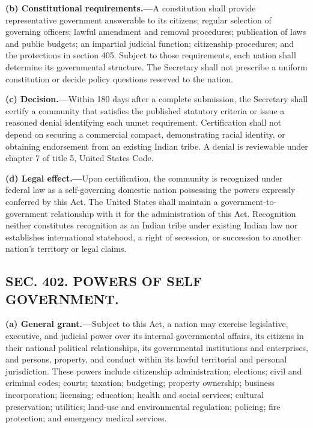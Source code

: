 \documentclass[12pt,letterpaper]{article}
\begin{document}
\textbf{(b) Constitutional requirements.---}A constitution shall provide representative government answerable to its citizens; regular selection of governing officers; lawful amendment and removal procedures; publication of laws and public budgets; an impartial judicial function; citizenship procedures; and the protections in section 405. Subject to those requirements, each nation shall determine its governmental structure. The Secretary shall not prescribe a uniform constitution or decide policy questions reserved to the nation.

\textbf{(c) Decision.---}Within 180 days after a complete submission, the Secretary shall certify a community that satisfies the published statutory criteria or issue a reasoned denial identifying each unmet requirement. Certification shall not depend on securing a commercial compact, demonstrating racial identity, or obtaining endorsement from an existing Indian tribe. A denial is reviewable under chapter 7 of title 5, United States Code.

\textbf{(d) Legal effect.---}Upon certification, the community is recognized under federal law as a self-governing domestic nation possessing the powers expressly conferred by this Act. The United States shall maintain a government-to-government relationship with it for the administration of this Act. Recognition neither constitutes recognition as an Indian tribe under existing Indian law nor establishes international statehood, a right of secession, or succession to another nation's territory or legal claims.

\subsection*{SEC. 402. POWERS OF SELF GOVERNMENT.}

\textbf{(a) General grant.---}Subject to this Act, a nation may exercise legislative, executive, and judicial power over its internal governmental affairs, its citizens in their national political relationships, its governmental institutions and enterprises, and persons, property, and conduct within its lawful territorial and personal jurisdiction. These powers include citizenship administration; elections; civil and criminal codes; courts; taxation; budgeting; property ownership; business incorporation; licensing; education; health and social services; cultural preservation; utilities; land-use and environmental regulation; policing; fire protection; and emergency medical services.
\end{document}
